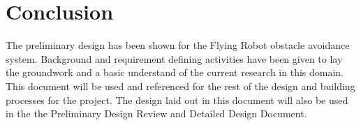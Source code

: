 \documentclass{article}
\begin{document}
\section{Conclusion}
The preliminary design has been shown for the Flying Robot obstacle avoidance system. Background and requirement defining activities have been given to lay the groundwork and a basic understand of the current research in this domain. This document will be used and referenced for the rest of the design and building processes for the project. The design laid out in this document will also be used in the the Preliminary Design Review and Detailed Design Document. 

\printbibliography

\end{document}
